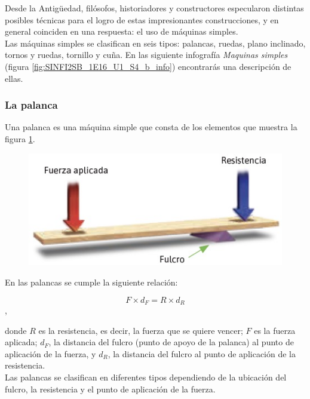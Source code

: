 \documentclass[11pt]{book}
\begin{document}
Desde la Antigüedad, filósofos, historiadores y constructores especularon
distintas posibles técnicas para el logro de estas impresionantes construcciones,
y en general coinciden en una respuesta: el uso de máquinas simples.\\


Las máquinas simples se clasifican en seis tipos: palancas, ruedas, plano inclinado,
tornos y ruedas, tornillo y cuña. En las siguiente infografía \emph{Maquinas simples}
(figura \ref{fig:SINFI2SB_1E16_U1_S4_b_info})
encontrarás una descripción de ellas.

\subsubsection{La palanca}
Una palanca es una máquina simple que consta de los elementos que muestra la
figura \ref{fig:palanca_gral}.

\begin{figure}[H]
    \centering
    \includegraphics[width=0.6\linewidth]{palanca_gral.jpg}
    \label{fig:palanca_gral}
\end{figure}

En las palancas se cumple la siguiente relación:

\begin{equation}
    F \times d_F = R \times d_R
\end{equation},

donde $R$ es la resistencia, es decir, la fuerza que se quiere vencer; $F$ es
la fuerza aplicada; $d_F$, la distancia del fulcro (punto de apoyo de la palanca)
al punto de aplicación de la fuerza, y $d_R$, la distancia del fulcro al punto de
aplicación de la resistencia. \\

Las palancas se clasifican en diferentes tipos dependiendo de la ubicación del
fulcro, la resistencia y el punto de aplicación de la fuerza.
\end{document}
